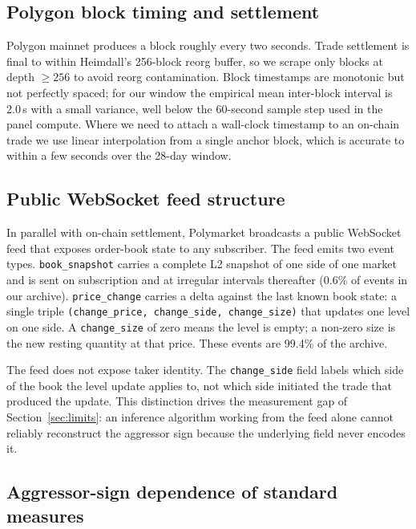\subsection{Polygon block timing and settlement}

Polygon mainnet produces a block roughly every two seconds. Trade
settlement is final to within Heimdall's 256-block reorg buffer,
so we scrape only blocks at depth $\geq 256$ to avoid reorg
contamination. Block timestamps are monotonic but not perfectly
spaced; for our window the empirical mean inter-block interval is
2.0\,s with a small variance, well below the 60-second sample step
used in the panel compute. Where we need to attach a wall-clock
timestamp to an on-chain trade we use linear interpolation from a
single anchor block, which is accurate to within a few seconds over
the 28-day window.

\subsection{Public WebSocket feed structure}

In parallel with on-chain settlement, Polymarket broadcasts a public
WebSocket feed that exposes order-book state to any subscriber. The
feed emits two event types. \texttt{book\_snapshot} carries a
complete L2 snapshot of one side of one market and is sent on
subscription and at irregular intervals thereafter (0.6\% of events
in our archive). \texttt{price\_change} carries a delta against the
last known book state: a single triple
\texttt{(change\_price, change\_side, change\_size)} that updates one
level on one side. A \texttt{change\_size} of zero means the level
is empty; a non-zero size is the new resting quantity at that price.
These events are 99.4\% of the archive.

The feed does not expose taker identity. The \texttt{change\_side}
field labels which side of the book the level update applies to,
not which side initiated the trade that produced the update. This
distinction drives the measurement gap of Section~\ref{sec:limits}:
an inference algorithm working from the feed alone cannot reliably
reconstruct the aggressor sign because the underlying field never
encodes it.

\subsection{Aggressor-sign dependence of standard measures}

